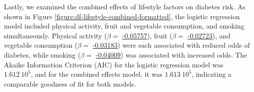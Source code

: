 \documentclass[11pt]{article}
\begin{document}
Lastly, we examined the combined effects of lifestyle factors on diabetes risk. As shown in Figure \ref{figure:df-lifestyle-combined-formatted}, the logistic regression model included physical activity, fruit and vegetable consumption, and smoking simultaneously. Physical activity (\(\beta =\) \hyperlink{C0a}{-0.05757}), fruit (\(\beta =\) \hyperlink{C1a}{-0.02723}), and vegetable consumption (\(\beta =\) \hyperlink{C2a}{-0.03183}) were each associated with reduced odds of diabetes, while smoking (\(\beta =\) \hyperlink{C3a}{-0.04009}) was associated with increased odds. The Akaike Information Criterion (AIC) for the logistic regression model was \hyperlink{R1a}{$1.612\ 10^{5}$}, and for the combined effects model, it was \hyperlink{R2a}{$1.613\ 10^{5}$}, indicating a comparable goodness of fit for both models.

\end{document}
